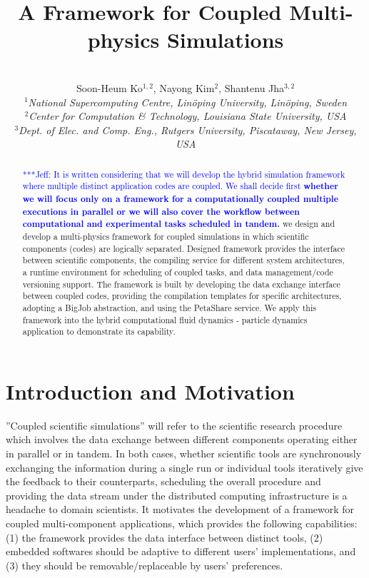 \documentclass[10pt,conference]{IEEEtran}
\title{A Framework for Coupled Multi-physics Simulations \skonote{some charming title?? emphasizing ''it can cover various kinds of applications in different requirement, main components can be replaced by other similar softwares, etc.''} }
\author{
 ~\\[-2em]
 Soon-Heum Ko$^{1,2}$, Nayong Kim$^{2}$, Shantenu Jha$^{3,2}$\\
 \small{\emph{$^{1}$National Supercomputing Centre, Lin\"{o}ping University, Lin\"{o}ping, Sweden}}\\
 \small{\emph{$^{2}$Center for Computation \& Technology, Louisiana State University, USA}}\\
 \small{\emph{$^{3}$Dept. of Elec. and Comp. Eng., Rutgers University, Piscataway, New Jersey, USA}}\\
}
\newcommand{\skonote}[1]{ {\textcolor{blue} { ***Jeff: #1 }}}
\newcommand{\skonote}[1]{}
\newcommand{\up}{\vspace*{-1em}}
\begin{document}
\maketitle

\begin{abstract}
\skonote{It is written considering that we will develop the hybrid simulation framework where multiple distinct application codes are coupled. We shall decide first \textbf{whether we will focus only on a framework for a computationally coupled multiple executions in parallel or we will also cover the workflow between computational and experimental tasks scheduled in tandem.}}
we design and develop a multi-physics framework for coupled simulations 
in which scientific components (codes) are logically separated. 
Designed framework provides the interface between scientific 
components, the compiling service for different system architectures, a 
runtime environment for scheduling of coupled tasks, and data 
management/code versioning support. The framework is built by 
developing the data exchange interface between coupled codes, providing 
the compilation templates for specific architectures, adopting a BigJob 
abstraction, and using the PetaShare service. We apply this framework 
into the hybrid computational fluid dynamics - particle dynamics 
application to demonstrate its capability.
\end{abstract}
\up\up

\section{Introduction and Motivation}

''Coupled scientific simulations'' will refer to the scientific 
research procedure which involves the data exchange between different 
components operating either in parallel or in tandem. In both cases, 
whether scientific tools are synchronously exchanging the information 
during a single run or individual tools iteratively give the feedback 
to their counterparts, scheduling the overall procedure and providing 
the data stream under the distributed computing infrastructure is a 
headache to domain scientists. It motivates the development of a 
framework for coupled multi-component applications, which provides the 
following capabilities:
(1) the framework provides the data interface between distinct tools,
(2) embedded softwares should be adaptive to different users' 
implementations, and 
(3) they should be removable/replaceable by users' preferences.
\end{document}
